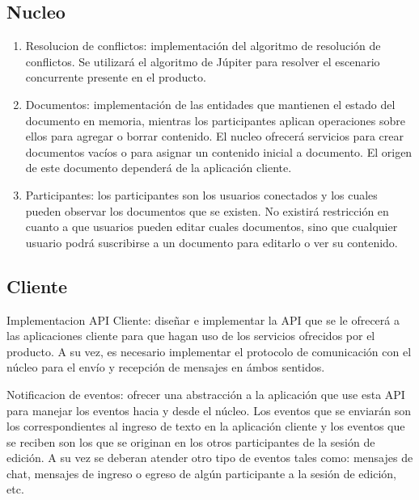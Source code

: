 \documentclass[12pt,a4paper]{article}
\begin{document}
	\subsection{Nucleo}
	\begin{enumerate}
	\item Resolucion de conflictos: implementación del algoritmo de resolución de conflictos. Se utilizará el algoritmo de Júpiter \cite{jupiter} para resolver el escenario concurrente presente en el producto.
	\item Documentos: implementación de las entidades que mantienen el estado del documento en memoria, mientras los participantes aplican operaciones sobre ellos para agregar o borrar contenido. El nucleo ofrecerá servicios para crear documentos vacíos o para asignar un contenido inicial a documento. El origen de este documento dependerá de la aplicación cliente.
	\item Participantes: los participantes son los usuarios conectados y los cuales pueden observar los documentos que se existen. No existirá restricción en cuanto a que usuarios pueden editar cuales documentos, sino que cualquier usuario podrá suscribirse a un documento para editarlo o ver su contenido.
	
	\end{enumerate}


	\subsection{Cliente}


Implementacion API Cliente: diseñar e implementar la API que se le ofrecerá a las aplicaciones cliente para que hagan uso de los servicios ofrecidos por el producto.
A su vez, es necesario implementar el protocolo de comunicación con el núcleo para el envío y recepción de mensajes en ámbos sentidos.

Notificacion de eventos: ofrecer una abstracción a la aplicación que use esta API para manejar los eventos hacia y desde el núcleo. Los eventos que se enviarán son los correspondientes al ingreso de texto en la aplicación cliente y los eventos que se reciben son los que se originan en los otros participantes de la sesión de edición.
A su vez se deberan atender otro tipo de eventos tales como: mensajes de chat, mensajes de ingreso o egreso de algún participante a la sesión de edición, etc.
\end{document}
